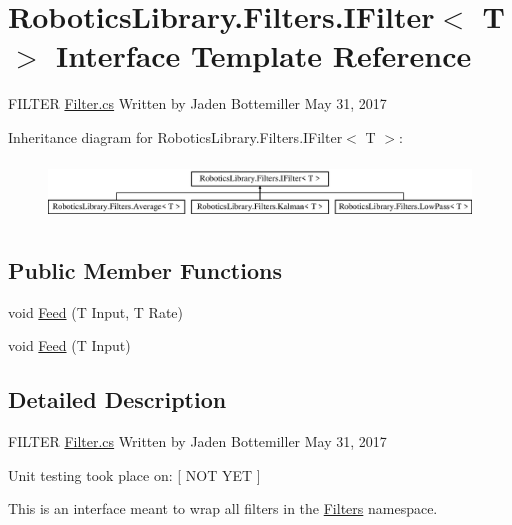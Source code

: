 \hypertarget{interface_robotics_library_1_1_filters_1_1_i_filter}{}\section{Robotics\+Library.\+Filters.\+I\+Filter$<$ T $>$ Interface Template Reference}
\label{interface_robotics_library_1_1_filters_1_1_i_filter}


F\+I\+L\+T\+ER \hyperlink{_filter_8cs}{Filter.\+cs} Written by Jaden Bottemiller May 31, 2017  


Inheritance diagram for Robotics\+Library.\+Filters.\+I\+Filter$<$ T $>$\+:\begin{figure}[H]
\begin{center}
\leavevmode
\includegraphics[height=1.602289cm]{interface_robotics_library_1_1_filters_1_1_i_filter}
\end{center}
\end{figure}
\subsection*{Public Member Functions}
\begin{DoxyCompactItemize}
\item 
void \hyperlink{interface_robotics_library_1_1_filters_1_1_i_filter_a24d363fb2957923a256448e04634d9ca}{Feed} (T Input, T Rate)
\item 
void \hyperlink{interface_robotics_library_1_1_filters_1_1_i_filter_a64855020add7b0354c2773696521c84e}{Feed} (T Input)
\end{DoxyCompactItemize}


\subsection{Detailed Description}
F\+I\+L\+T\+ER \hyperlink{_filter_8cs}{Filter.\+cs} Written by Jaden Bottemiller May 31, 2017 

Unit testing took place on\+: \mbox{[} N\+OT Y\+ET \mbox{]}

This is an interface meant to wrap all filters in the \hyperlink{namespace_robotics_library_1_1_filters}{Filters} namespace.


